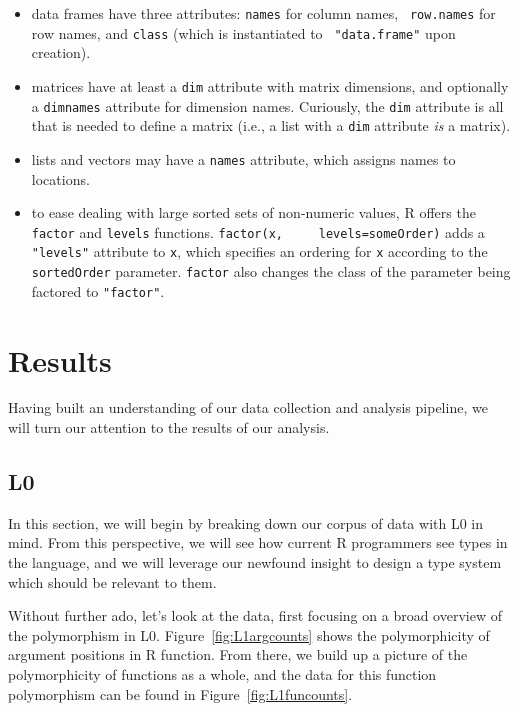 \documentclass[acmsmall,10pt,review,anonymous]{acmart}\settopmatter{printfolios=true,printccs=false,printacmref=false}
\newcommand{\code}[1]{\lstinline|#1|\xspace}
\begin{document}
\begin{itemize}
\item data frames have three attributes: {\tt names} for column names, {\tt
  row.names} for row names, and {\tt class} (which is instantiated to {\tt
  "data.frame"} upon creation).
\item matrices have at least a {\tt dim} attribute with matrix dimensions,
  and optionally a {\tt dimnames} attribute for dimension names. Curiously,
  the {\tt dim} attribute is all that is needed to define a matrix (i.e., a
  list with a {\tt dim} attribute {\it is} a matrix).
\item lists and vectors may have a {\tt names} attribute, which assigns
  names to locations.
\item to ease dealing with large sorted sets of non-numeric values, R offers
  the \code{factor} and \code{levels} functions.  \code{factor(x,
    levels=someOrder)} adds a {\tt "levels"} attribute to \code{x}, which
  specifies an ordering for \code{x} according to the \code{sortedOrder}
  parameter.  \code{factor} also changes the class of the parameter being
  factored to \texttt{"factor"}.
\end{itemize}

\section{Results}\label{sec:results}

Having built an understanding of our data collection and analysis pipeline,
we will turn our attention to the results of our analysis.

\subsection{L0}

In this section, we will begin by breaking down our corpus of data with L0
in mind.  From this perspective, we will see how current R programmers see
types in the language, and we will leverage our newfound insight to design a
type system which should be relevant to them.

Without further ado, let's look at the data, first focusing on a broad
overview of the polymorphism in L0.  Figure~\ref{fig:L1argcounts} shows the
polymorphicity of argument positions in R function.  From there, we build up
a picture of the polymorphicity of functions as a whole, and the data for
this function polymorphism can be found in Figure~\ref{fig:L1funcounts}.
\end{document}
